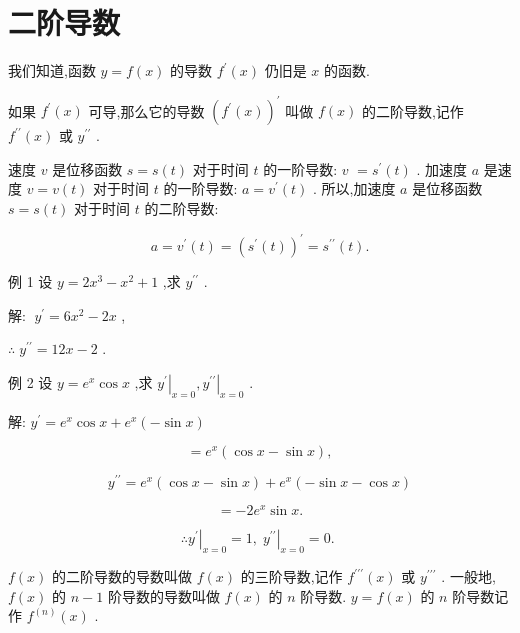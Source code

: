 \documentclass[lang=cn,newtx,10pt,scheme=chinese]{elegantbook}
\begin{document}
\section{二阶导数}

我们知道,函数 \(y = f\left( x\right)\) 的导数 \({f}^{\prime }\left( x\right)\) 仍旧是 \(x\) 的函数.
\begin{definition}[二阶导数]
如果 \({f}^{\prime }\left( x\right)\) 可导,那么它的导数 \({\left( {f}^{\prime }\left( x\right) \right) }^{\prime }\) 叫做 \(f\left( x\right)\) 的二阶导数,记作 \({f}^{\prime \prime }\left( x\right)\) 或 \({y}^{\prime \prime }\) .
\end{definition}
速度 \(v\) 是位移函数 \(s = s\left( t\right)\) 对于时间 \(t\) 的一阶导数: \(v\) \(= {s}^{\prime }\left( t\right)\) . 加速度 \(a\) 是速度 \(v = v\left( t\right)\) 对于时间 \(t\) 的一阶导数: \(a = {v}^{\prime }\left( t\right)\) . 所以,加速度 \(a\) 是位移函数 \(s = s\left( t\right)\) 对于时间 \(t\) 的二阶导数:

\[
a = {v}^{\prime }\left( t\right) = {\left( {s}^{\prime }\left( t\right) \right) }^{\prime } = {s}^{\prime \prime }\left( t\right) .
\]

例 1 设 \(y = 2{x}^{3} - {x}^{2} + 1\) ,求 \({y}^{\prime \prime }\) .

解: \(\;{y}^{\prime } = 6{x}^{2} - {2x}\) ,

\(\therefore \;{y}^{\prime \prime } = {12x} - 2\) .

例 2 设 \(y = {e}^{x}\cos x\) ,求 \({\left. {y}^{\prime }\right| }_{x = 0},{\left. {y}^{\prime \prime }\right| }_{x = 0}\) .

解: \({y}^{\prime } = {e}^{x}\cos x + {e}^{x}\left( {-\sin x}\right)\)

\[
= {e}^{x}\left( {\cos x - \sin x}\right) ,
\]

\[
{y}^{\prime \prime } = {e}^{x}\left( {\cos x - \sin x}\right) + {e}^{x}\left( {-\sin x - \cos x}\right)
\]

\[
= - 2{e}^{x}\sin x\text{.}
\]

\[
\therefore {\left. {y}^{\prime }\right| }_{x = 0} = 1,{\left. \;{y}^{\prime \prime }\right| }_{x = 0} = 0\text{. }
\]

\(f\left( x\right)\) 的二阶导数的导数叫做 \(f\left( x\right)\) 的三阶导数,记作 \({f}^{\prime \prime \prime }\left( x\right)\) 或 \({y}^{\prime \prime \prime }\) . 一般地, \(f\left( x\right)\) 的 \(n - 1\) 阶导数的导数叫做 \(f\left( x\right)\) 的 \(n\) 阶导数. \(y = f\left( x\right)\) 的 \(n\) 阶导数记作 \({f}^{\left( n\right) }\left( x\right)\) .
\end{document}

